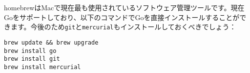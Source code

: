 homebrewはMacで現在最も使用されているソフトウェア管理ツールです。現在Goをサポートしており、以下のコマンドでGoを直接インストールすることができます。今後のため\texttt{git}と\texttt{mercurial}もインストールしておくべきでしょう：

\begin{lstlisting}[numbers=none]
brew update && brew upgrade
brew install go
brew install git
brew install mercurial
\end{lstlisting}

